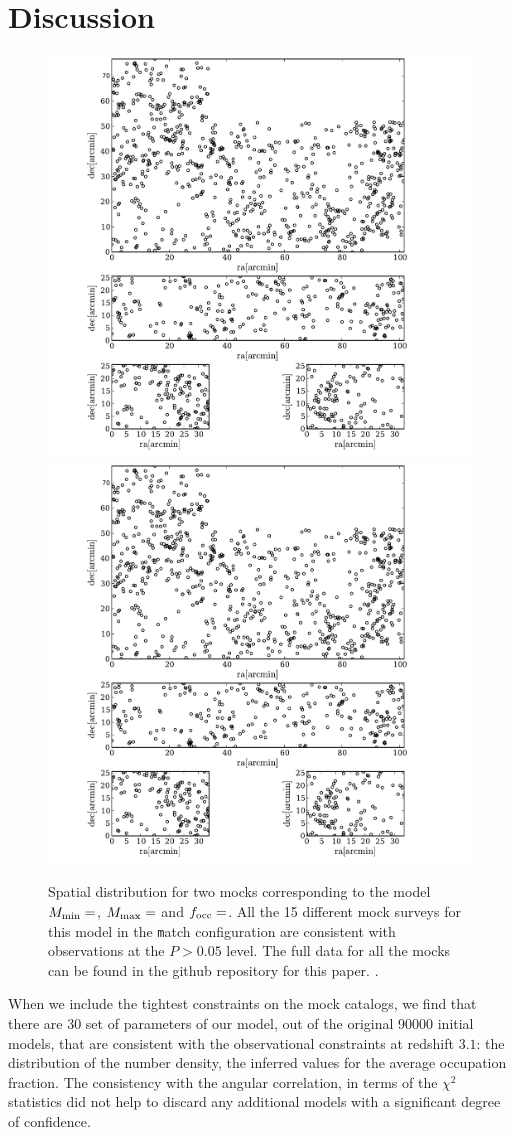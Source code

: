 \documentclass[usenatbib]{mn2e}
\begin{document}
\section{Discussion}



\begin{figure}
\begin{center}
\includegraphics[width=0.49\linewidth,angle=0]{./plots/mytest.pdf}
\includegraphics[width=0.49\linewidth,angle=0]{./plots/mytest.pdf}
\end{center} 
\caption{Spatial distribution for two mocks corresponding to the model
  $M_{\rm min}=$, $M_{\rm max}=$ and $f_{\rm occ}=$. All the 15
  different mock  surveys for this model in the {\texttt match}
  configuration are consistent with observations at the $P>0.05$
  level. The full data for all the mocks can be found in the github
  repository for this paper.
  \label{figure:spatial_distro}.}
\end{figure}


When we include the tightest constraints on the mock catalogs, we find
that there are 30 set of parameters of our model, out of the original
90000 initial models, that are consistent with the observational
constraints at redshift $3.1$: the distribution of the number density,
the inferred values for the average occupation fraction. The
consistency with the angular correlation, in terms of the $\chi^2$
statistics did not help to discard any additional models with a
significant degree of confidence. 
\end{document}
